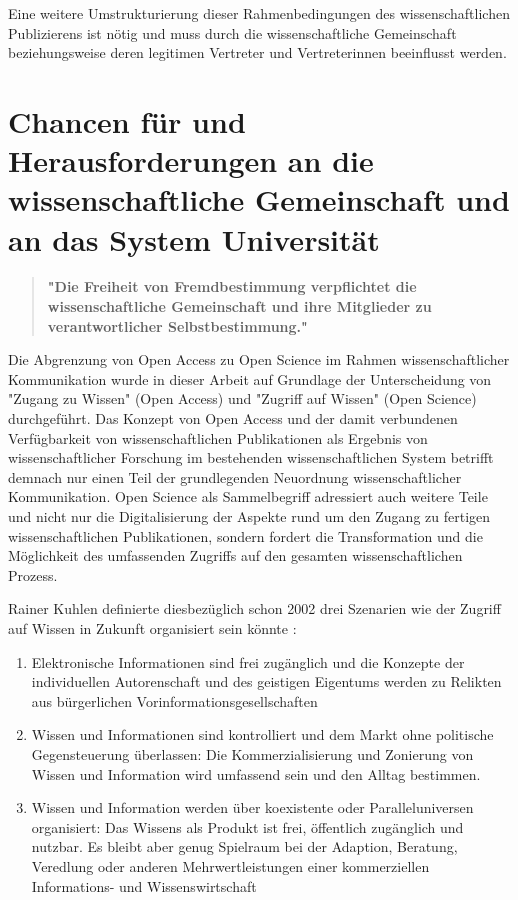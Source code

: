 Eine weitere Umstrukturierung dieser Rahmenbedingungen des wissenschaftlichen Publizierens ist nötig \cite{naeder_2010_open} und muss durch die wissenschaftliche Gemeinschaft beziehungsweise deren legitimen Vertreter und Vertreterinnen beeinflusst werden.

\section{Chancen für und Herausforderungen an die wissenschaftliche Gemeinschaft und an das System Universität}

\begin{quote}
\textbf{"Die Freiheit von Fremdbestimmung verpflichtet die wissenschaftliche Gemeinschaft und ihre Mitglieder zu verantwortlicher Selbstbestimmung."}
\end{quote} \cite{Oezmen_2015}

Die Abgrenzung von Open Access zu Open Science im Rahmen wissenschaftlicher Kommunikation wurde in dieser Arbeit auf Grundlage der Unterscheidung von "Zugang zu Wissen" (Open Access) und "Zugriff auf Wissen" (Open Science) durchgeführt. Das Konzept von Open Access und der damit verbundenen Verfügbarkeit von wissenschaftlichen Publikationen als Ergebnis von wissenschaftlicher Forschung im bestehenden wissenschaftlichen System betrifft demnach nur einen Teil der grundlegenden Neuordnung wissenschaftlicher Kommunikation. Open Science als Sammelbegriff adressiert auch weitere Teile und nicht nur die Digitalisierung der Aspekte rund um den Zugang zu fertigen wissenschaftlichen Publikationen, sondern fordert die Transformation und die Möglichkeit des umfassenden Zugriffs auf den gesamten wissenschaftlichen Prozess.

Rainer Kuhlen definierte diesbezüglich schon 2002 drei Szenarien wie der Zugriff auf Wissen in Zukunft organisiert sein könnte \cite{Kuhlen_2002_universalaccess}:
\begin{enumerate}
\item Elektronische Informationen sind frei zugänglich und die Konzepte der individuellen Autorenschaft und des geistigen Eigentums werden zu Relikten aus bürgerlichen Vorinformationsgesellschaften
\item Wissen und Informationen sind kontrolliert und dem Markt ohne politische Gegensteuerung überlassen: Die Kommerzialisierung und Zonierung von Wissen und Information wird umfassend sein und den Alltag bestimmen.
\item Wissen und Information werden über koexistente oder Paralleluniversen organisiert: Das Wissens als Produkt ist frei, öffentlich zugänglich und nutzbar. Es bleibt aber genug Spielraum bei der Adaption, Beratung, Veredlung oder anderen Mehrwertleistungen einer kommerziellen Informations- und Wissenswirtschaft
\end{enumerate}

